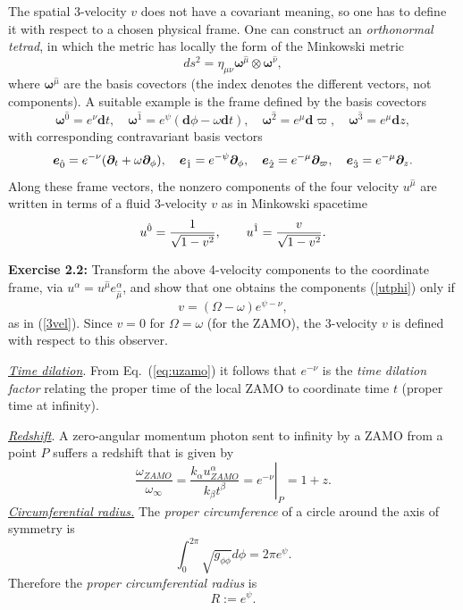 \documentclass[12pt]{article}
\def\be{\begin{equation}}
\def\ee{\end{equation}}
\begin{document}
 The spatial 3-velocity $v$ does not have a covariant meaning, so one has to define it with respect to a chosen physical frame. One can construct an
\textit{orthonormal tetrad}, in which the metric has locally the form of the 
Minkowski metric
\begin{equation}
ds^2=\eta_{\mu\nu} {\bm \omega}^{\hat \mu} \otimes {\bm \omega}^{\hat \nu},
\end{equation}
where ${\bm \omega}^{\hat \mu}$ are the basis covectors (the index
denotes the different vectors, not components). A suitable example 
is the frame defined by the basis covectors
\be
{\bm \omega}^{\hat 0} = e^{\nu} {\bm d}t ,\quad 
{\bm \omega}^{\hat 1} = e^{\psi}({\bm d}\phi -\omega {\bm d}t),\quad 
{\bm \omega}^{\hat2} = e^{\mu}{\bm d}\varpi ,\quad 
{\bm \omega}^{\hat3} = e^{\mu} {\bm d}z,
\label{eq:omi}
\ee
with corresponding contravariant basis vectors
\be
{\bm e}_{\hat 0} = e^{-\nu} ({\bm \partial}_t 
                   + \omega {\bm \partial}_{\phi}),
\quad {\bm e}_{\hat 1} = e^{-\psi} {\bm \partial}_{\phi},
\quad {\bm e}_{\hat2} = e^{-\mu} {\bm \partial}_{\varpi} ,
\quad {\bm e}_{\hat3}= e^{-\mu} {\bm \partial}_z. \label{ei}
\index{rotating stars!basis vectors}\ee
Along these 
frame vectors, the nonzero components of the four velocity $u^{\hat \mu}$ are written in terms of a fluid 3-velocity 
$v$ as in Minkowski spacetime
\be
u^{\hat 0} = {1\over{{\sqrt{1-v^2}}}} , \qquad  u^{\hat 1}
= {v\over{{\sqrt{1-v^2}}}}.
\label{eq:utetrad}\ee

\vskip0.5cm
\textbf{Exercise 2.2:} Transform the above 4-velocity components to the coordinate frame, via $u^\alpha=
u^{\hat \mu}e^\alpha_{\hat\mu}$, and show that one obtains the components 
(\ref{utphi}) only if 
\be
\boxed{v =(\Omega - \omega) e^{\psi -\nu} },
\label{eq:v}
\ee
as in (\ref{3vel}). 
\vskip0.5cm
Since $v=0$ for $\Omega=\omega$ 
(for the ZAMO), the 3-velocity $v$ is defined with respect to this observer.

\vskip0.8cm

\noindent \textit{\uline{Time dilation}}. From 
Eq.~(\ref{eq:uzamo}) it  follows that $e^{-\nu}$ is the {\it time dilation factor} 
relating the proper time of the local 
ZAMO to coordinate time $t$ (proper time at infinity). 

\vskip0.8cm
\noindent \textit{\uline{Redshift}}. A zero-angular momentum photon 
sent to infinity by a ZAMO from a point $P $ suffers a redshift that  is given by 
\be \left.  \frac{\omega_{ZAMO}}{\omega_\infty}
        = \frac{k_\alpha u_{ZAMO}^\alpha }{ k_\beta t^\beta} = e^{-\nu}\right|_P = 1+z.
        \ee
\vskip0.8cm
\noindent \textit{\uline{Circumferential radius.}}
The {\it proper circumference} of a circle around the axis of
symmetry is
\be \int_0^{2\pi} \sqrt{g_{\phi\phi}}d\phi=2\pi e^\psi.
\ee 
Therefore the  \textit{proper 
circumferential  radius} is
\be \boxed{R:=e^\psi }.
\ee 
\end{document}
